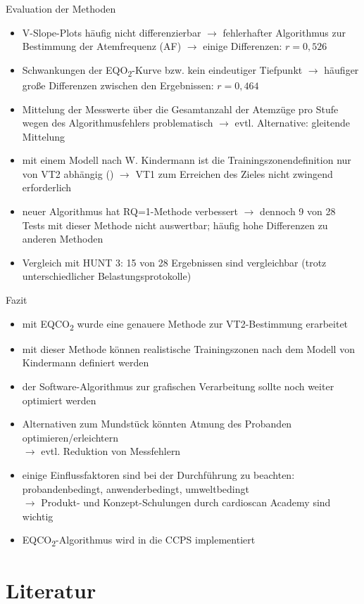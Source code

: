\documentclass[colorBG,slideColor,8pt]{beamer}
\newcommand{\eqotwo}{EQO\textsubscript{2}}
\newcommand{\eqcotwo}{EQCO\textsubscript{2}}
\begin{document}
\begin{frame}{Evaluation der Methoden}
\begin{itemize}
	\item V-Slope-Plots häufig nicht differenzierbar $\rightarrow$ fehlerhafter Algorithmus zur Bestimmung der Atemfrequenz (AF) $\rightarrow$ einige Differenzen: $r = 0,526$
	\item Schwankungen der \eqotwo-Kurve bzw. kein eindeutiger Tiefpunkt $\rightarrow$ häufiger große Differenzen zwischen den Ergebnissen: $r = 0,464$
	\item Mittelung der Messwerte über die Gesamtanzahl der Atemzüge pro Stufe wegen des Algorithmusfehlers problematisch $\rightarrow$ evtl. Alternative: gleitende Mittelung
	\item mit einem Modell nach W. Kindermann ist die Trainingszonendefinition nur von VT2 abhängig (\cite{Kindermann.2004}) $\rightarrow$ VT1 zum Erreichen des Zieles nicht zwingend erforderlich
	\item neuer Algorithmus hat RQ=1-Methode verbessert $\rightarrow$ dennoch 9 von 28 Tests mit dieser Methode nicht auswertbar; häufig hohe Differenzen zu anderen Methoden
	\item Vergleich mit HUNT 3: 15 von 28 Ergebnissen sind vergleichbar (trotz unterschiedlicher Belastungsprotokolle)
\end{itemize}
\end{frame}

\begin{frame}{Fazit}
\begin{itemize}
	\item mit \eqcotwo{} wurde eine genauere Methode zur VT2-Bestimmung erarbeitet
	\item mit dieser Methode können realistische Trainingszonen nach dem Modell von Kindermann definiert werden
	\item der Software-Algorithmus zur grafischen Verarbeitung sollte noch weiter optimiert werden
	\item Alternativen zum Mundstück könnten Atmung des Probanden optimieren/erleichtern\\$\rightarrow$ evtl. Reduktion von Messfehlern
	\item einige Einflussfaktoren sind bei der Durchführung zu beachten: probandenbedingt, anwenderbedingt, umweltbedingt\\$\rightarrow$ Produkt- und Konzept-Schulungen durch cardioscan Academy sind wichtig
	\item \eqcotwo-Algorithmus wird in die CCPS implementiert
\end{itemize}
\end{frame}

\section{Literatur}

\begin{frame}
\begin{columns}
\begin{column}{0.9\linewidth}
\nocite{*}
\printbibliography
\end{column}
\end{columns}
\end{frame}
\end{document}
